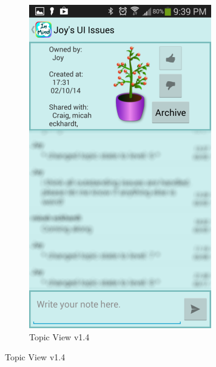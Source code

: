 \begin{figure}
    \begin{subfigure}[b]{0.4\textwidth}
      \includegraphics[width=\textwidth]{plant_final.png}
       \caption{Topic View v1.4}
    \end{subfigure}
    \label{fig:topic_screens}
  \end{figure}
